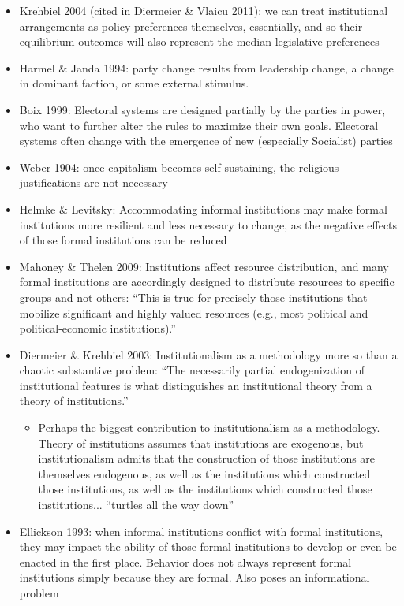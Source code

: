 \documentclass[12pt]{article}
\begin{document}
\begin{itemize}
\begin{itemize}
    \end{itemize}
    \item Krehbiel 2004 (cited in Diermeier \& Vlaicu 2011): we can treat institutional arrangements as policy preferences themselves, essentially, and so their equilibrium outcomes will also represent the median legislative preferences
    \item Harmel \& Janda 1994: party change results from leadership change, a change in dominant faction, or some external stimulus.
    \item Boix 1999: Electoral systems are designed partially by the parties in power, who want to further alter the rules to maximize their own goals. Electoral systems often change with the emergence of new (especially Socialist) parties
    \item Weber 1904: once capitalism becomes self-sustaining, the religious justifications are not necessary
    \item Helmke \& Levitsky: Accommodating informal institutions may make formal institutions more resilient and less necessary to change, as the negative effects of those formal institutions can be reduced
    \item Mahoney \& Thelen 2009: Institutions affect resource distribution, and many formal institutions are accordingly designed to distribute resources to specific groups and not others: ``This is true for precisely those institutions that mobilize significant and highly valued resources (e.g., most political and political-economic institutions).''
    \item Diermeier \& Krehbiel 2003: Institutionalism as a methodology more so than a chaotic substantive problem: ``The necessarily partial endogenization of institutional features is what distinguishes an institutional theory from a theory of institutions.''
    \begin{itemize}
        \item Perhaps the biggest contribution to institutionalism as a methodology. Theory of institutions assumes that institutions are exogenous, but institutionalism admits that the construction of those institutions are themselves endogenous, as well as the institutions which constructed those institutions, as well as the institutions which constructed those institutions... ``turtles all the way down''
    \end{itemize}
    \item Ellickson 1993: when informal institutions conflict with formal institutions, they may impact the ability of those formal institutions to develop or even be enacted in the first place. Behavior does not always represent formal institutions simply because they are formal. Also poses an informational problem

\end{itemize}
\end{document}
